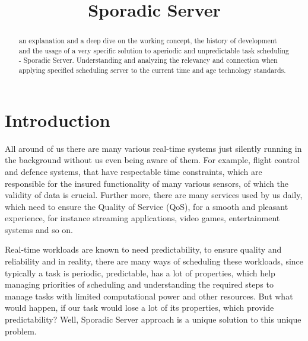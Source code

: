 \documentclass[conference]{IEEEtran}
\begin{document}
\title{Sporadic Server}

\author{
}

\maketitle

\begin{abstract}
an explanation and a deep dive on the working concept, the history of development and the usage of a very specific solution to aperiodic and unpredictable task scheduling - Sporadic Server. Understanding and analyzing the relevancy and connection when applying specified scheduling server to the current time and age technology standards.
\end{abstract}



\thispagestyle{firstpagefooter}

\section{Introduction}
All around of us there are many various real-time systems just silently running in the background without us even being aware of them. For example, flight control and defence systems, that have respectable time constraints, which are responsible for the insured functionality of many various sensors, of which the validity of data is crucial. Further more, there are many services used by us daily, which need to ensure the Quality of Service (QoS), for a smooth and pleasant experience, for instance streaming applications, video games, entertainment systems and so on.

Real-time workloads are known to need predictability, to ensure quality and reliability and in reality, there are many ways of scheduling these workloads, since typically a task is periodic, predictable, has a lot of properties, which help managing priorities of scheduling and understanding the required steps to manage tasks with limited computational power and other resources. But what would happen, if our task would lose a lot of its properties, which provide predictability? Well, Sporadic Server approach is a unique solution to this unique problem. 
\end{document}

